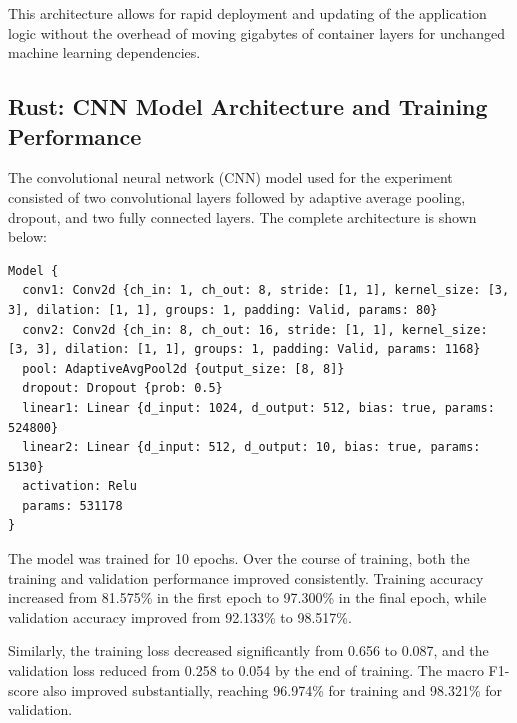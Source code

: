 \documentclass[10pt,a4paper,twocolumn]{article}
\begin{document}
This architecture allows for rapid deployment and updating of the application logic without the overhead of moving gigabytes of container layers for unchanged machine learning dependencies.

\subsection{Rust: CNN Model Architecture and Training Performance}

The convolutional neural network (CNN) model used for the experiment consisted of two convolutional layers followed by adaptive average pooling, dropout, and two fully connected layers. The complete architecture is shown below:

\begin{verbatim}
Model {
  conv1: Conv2d {ch_in: 1, ch_out: 8, stride: [1, 1], kernel_size: [3, 3], dilation: [1, 1], groups: 1, padding: Valid, params: 80}
  conv2: Conv2d {ch_in: 8, ch_out: 16, stride: [1, 1], kernel_size: [3, 3], dilation: [1, 1], groups: 1, padding: Valid, params: 1168}
  pool: AdaptiveAvgPool2d {output_size: [8, 8]}
  dropout: Dropout {prob: 0.5}
  linear1: Linear {d_input: 1024, d_output: 512, bias: true, params: 524800}
  linear2: Linear {d_input: 512, d_output: 10, bias: true, params: 5130}
  activation: Relu
  params: 531178
}
\end{verbatim}

The model was trained for 10 epochs. Over the course of training, both the training and validation performance improved consistently. Training accuracy increased from 81.575\% in the first epoch to 97.300\% in the final epoch, while validation accuracy improved from 92.133\% to 98.517\%.

Similarly, the training loss decreased significantly from 0.656 to 0.087, and the validation loss reduced from 0.258 to 0.054 by the end of training. The macro F1-score also improved substantially, reaching 96.974\% for training and 98.321\% for validation.
\end{document}
